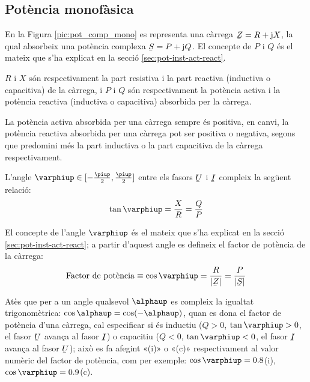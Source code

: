 \subsection{Potència monofàsica} 

En la Figura \vref{pic:pot_comp_mono} es representa una càrrega $\cmplx{Z}=R+\ju X$, la
qual absorbeix una potència complexa $\cmplx{S} = P + \ju Q$. El concepte de $P$ i $Q$ és el mateix que s'ha explicat en la secció \ref{sec:pot-inst-act-react}.
\begin{center}
    
    \label{pic:pot_comp_mono}
\end{center}

$R$ i $X$ són respectivament la part resistiva i la part reactiva
(inductiva o capacitiva) de la càrrega, i $P$ i $Q$ són
respectivament la potència activa i la potència reactiva (inductiva
o capacitiva) absorbida per la càrrega.

La potència activa absorbida per una càrrega sempre és positiva, en
canvi, la potència reactiva absorbida per una càrrega pot ser
positiva o negativa, segons que predomini més la part inductiva o la
part capacitiva de la càrrega respectivament.

L'angle $\varphiup\in[-\frac{\piup}{2},\frac{\piup}{2}]$ entre els fasors $\cmplx{U}$ i $\cmplx{I}$ compleix la següent relació:
\begin{equation}
   \tan\varphiup = \frac{X}{R} = \frac{Q}{P}
\end{equation}

El concepte de l'angle $\varphiup$ és el mateix que s'ha explicat en la secció \ref{sec:pot-inst-act-react}; a partir d'aquest angle es
defineix el factor de potència de la càrrega:
\begin{equation}
   \text{Factor de potència} \equiv \cos\varphiup = \frac{R}{|\cmplx{Z}|} =
   \frac{P}{|\cmplx{S}|}
\end{equation}

Atès que per a un angle qualsevol $\alphaup$ es compleix la igualtat
trigonomètrica: $\cos\alphaup = \cos(-\alphaup)$, quan es dona el factor
de potència d'una càrrega, cal especificar si és inductiu ($Q>0$,
$\tan\varphiup>0$, el fasor $\cmplx{U}$ avança al fasor $\cmplx{I}$) o
capacitiu ($Q<0$, $\tan\varphiup<0$, el fasor $\cmplx{I}$ avança al fasor $\cmplx{U}$); això es fa
afegint «(i)» o «(c)» respectivament al valor numèric del factor
de potència, com per exemple: $\cos\varphiup=\num{0,8}$(i),
$\cos\varphiup=\num{0,9}$(c).

